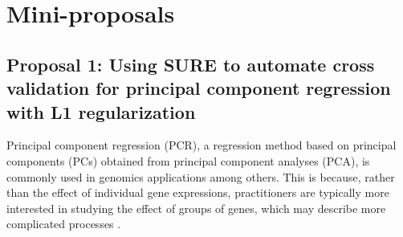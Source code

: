 

\section{Mini-proposals}

%

\subsection{Proposal 1: Using SURE to automate cross validation for principal component regression with L1 regularization} %

Principal component regression (PCR), a regression method based on principal components (PCs) obtained from principal component analyses (PCA), is commonly used in genomics applications among others. This is because, rather than the effect of individual gene expressions, practitioners are typically more interested in studying the effect of groups of genes, which may describe more complicated processes \citep{ding2022sufficient}. 

